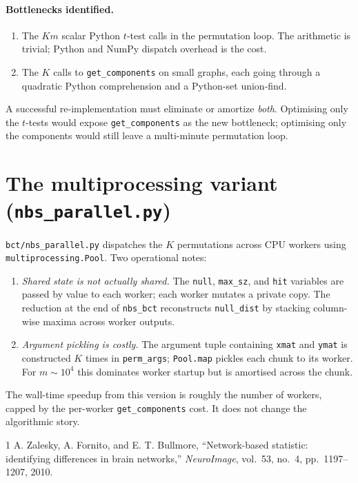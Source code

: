 \documentclass[11pt]{article}
\begin{document}
\paragraph{Bottlenecks identified.}
\begin{enumerate}[leftmargin=2.0em]
\item The $K m$ scalar Python $t$-test calls in the permutation loop. The arithmetic is trivial; Python and NumPy dispatch overhead is the cost.
\item The $K$ calls to \texttt{get\_components} on small graphs, each going through a quadratic Python comprehension and a Python-set union-find.
\end{enumerate}

A successful re-implementation must eliminate or amortize \emph{both}. Optimising only the $t$-tests would expose \texttt{get\_components} as the new bottleneck; optimising only the components would still leave a multi-minute permutation loop.

\section{The multiprocessing variant (\texttt{nbs\_parallel.py})}

\texttt{bct/nbs\_parallel.py} dispatches the $K$ permutations across CPU workers using \texttt{multiprocessing.Pool}. Two operational notes:

\begin{enumerate}[leftmargin=2.0em]
\item \emph{Shared state is not actually shared.} The \texttt{null}, \texttt{max\_sz}, and \texttt{hit} variables are passed by value to each worker; each worker mutates a private copy. The reduction at the end of \texttt{nbs\_bct} reconstructs \texttt{null\_dist} by stacking column-wise maxima across worker outputs.
\item \emph{Argument pickling is costly.} The argument tuple containing \texttt{xmat} and \texttt{ymat} is constructed $K$ times in \texttt{perm\_args}; \texttt{Pool.map} pickles each chunk to its worker. For $m\sim 10^4$ this dominates worker startup but is amortised across the chunk.
\end{enumerate}

The wall-time speedup from this version is roughly the number of workers, capped by the per-worker \texttt{get\_components} cost. It does not change the algorithmic story.

\begin{thebibliography}{1}
 A. Zalesky, A. Fornito, and E. T. Bullmore, ``Network-based statistic: identifying differences in brain networks,'' \emph{NeuroImage}, vol.~53, no.~4, pp.~1197--1207, 2010.
\end{thebibliography}
\end{document}
